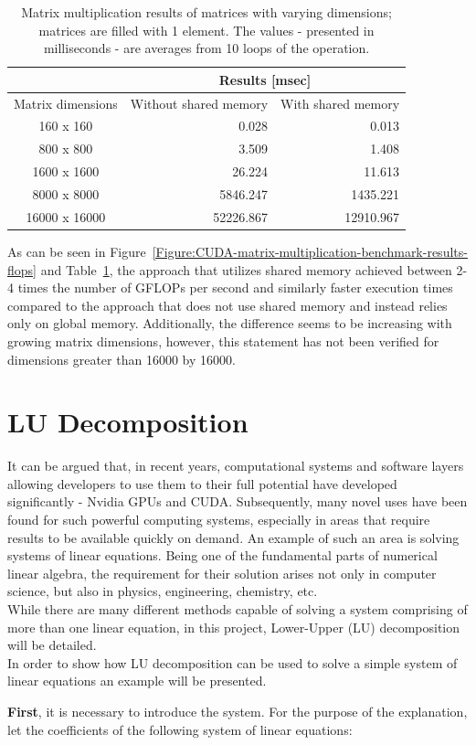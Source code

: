 \begin{table}[h!]
	\centering
	\renewcommand{\arraystretch}{1.5}
	\begin{tabular}{ |c|r|r| } 
		\hline
		& \multicolumn{2}{c|}{Results [msec]} \\
		\hline
		\multicolumn{1}{|c}{Matrix dimensions} & \multicolumn{1}{|c}{Without shared memory} & \multicolumn{1}{|c|}{With shared memory} \\
		\hline
		160 x 160 & 0.028 & 0.013 \\
		\hline
		800 x 800 & 3.509 & 1.408 \\
		\hline
		1600 x 1600 & 26.224 & 11.613 \\
		\hline
		8000 x 8000 & 5846.247 & 1435.221 \\
		\hline
		16000 x 16000 & 52226.867 & 12910.967 \\
		\hline
	\end{tabular}
	\caption{Matrix multiplication results of matrices with varying dimensions; matrices are filled with 1 element. The values - presented in milliseconds - are averages from 10 loops of the operation.}
	\label{Table:CUDA-matrix-multiplication-benchmark-results-msec}
\end{table}

As can be seen in Figure~\ref{Figure:CUDA-matrix-multiplication-benchmark-results-flops} and Table~\ref{Table:CUDA-matrix-multiplication-benchmark-results-msec}, the approach that utilizes shared memory achieved between 2-4 times the number of GFLOPs per second and similarly faster execution times compared to the approach that does not use shared memory and instead relies only on global memory. Additionally, the difference seems to be increasing with growing matrix dimensions, however, this statement has not been verified for dimensions greater than 16000 by 16000.



\section{LU Decomposition \TO}
It can be argued that, in recent years, computational systems and software layers allowing developers to use them to their full potential have developed significantly - Nvidia GPUs and CUDA. Subsequently, many novel uses have been found for such powerful computing systems, especially in areas that require results to be available quickly on demand. An example of such an area is solving systems of linear equations. Being one of the fundamental parts of numerical linear algebra, the requirement for their solution arises not only in computer science, but also in physics, engineering, chemistry, etc. \\
While there are many different methods capable of solving a system comprising of more than one linear equation, in this project, Lower-Upper (LU) decomposition will be detailed. \\
In order to show how LU decomposition can be used to solve a simple system of linear equations an example will be presented. 
\par \textbf{First}, it is necessary to introduce the system. For the purpose of the explanation, let the coefficients of the following system of linear equations:

